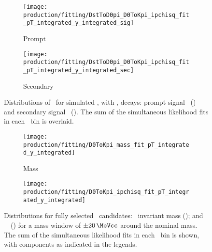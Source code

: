\begin{figure}
  \begin{subfigure}[b]{0.5\textwidth}
    \centering
    \texttt{[image: production/fitting/DstToD0pi\_D0ToKpi\_ipchisq\_fit\_pT\_integrated\_y\_integrated\_sig]}
    \caption{Prompt}
    \label{fig:prod:fitting:prefits:DstToD0pi_D0ToKpi:prompt}
  \end{subfigure}
  \begin{subfigure}[b]{0.5\textwidth}
    \centering
    \texttt{[image: production/fitting/DstToD0pi\_D0ToKpi\_ipchisq\_fit\_pT\_integrated\_y\_integrated\_sec]}
    \caption{Secondary}
    \label{fig:prod:fitting:prefits:DstToD0pi_D0ToKpi:secondary}
  \end{subfigure}
  \caption{%
    Distributions of \PDzero \lnipchisq\ for simulated \DstToDzpi, with 
    \DzToKpi, decays: prompt signal \PDstarp\
    () and secondary 
    signal \PDstarp\
    ().
    The sum of the simultaneous likelihood fits in each \pTy\ bin is overlaid.
  }
  \label{fig:prod:fitting:prefits:DstToD0pi_D0ToKpi}
\end{figure}

\begin{figure}
  \begin{subfigure}[b]{0.5\textwidth}
    \centering
    \texttt{[image: production/fitting/D0ToKpi\_mass\_fit\_pT\_integrated\_y\_integrated]}
    \caption{Mass}
    \label{fig:prod:fitting:D0ToKpi:mass}
  \end{subfigure}
  \begin{subfigure}[b]{0.5\textwidth}
    \centering
    \texttt{[image: production/fitting/D0ToKpi\_ipchisq\_fit\_pT\_integrated\_y\_integrated]}
    \caption{\lnipchisq}
    \label{fig:prod:fitting:D0ToKpi:ipchisq}
  \end{subfigure}
  \caption{%
    Distributions for fully selected \DzToKpi\ candidates: \PDzero\ invariant 
    mass (); and \PDzero\ \lnipchisq\ 
    () for a mass window of 
    $\pm\SI{20}{\MeVcc}$ around the nominal \PDzero mass.
    The sum of the simultaneous likelihood fits in each \pTy\ bin is shown, 
    with components as indicated in the legends.
  }
  \label{fig:prod:fitting:D0ToKpi}
\end{figure}

